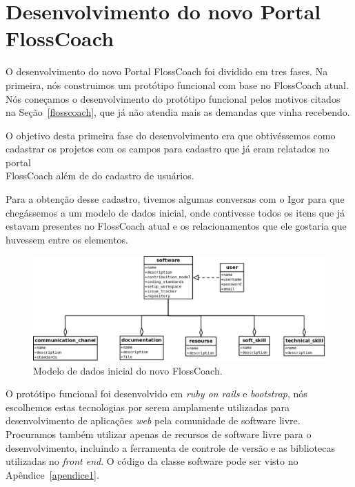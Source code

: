\chapter{Desenvolvimento do novo Portal \\FlossCoach}
\label{desenvolvimento}

O desenvolvimento do novo Portal FlossCoach foi dividido em tres fases. Na primeira, 
nós construimos um protótipo funcional com base no FlossCoach atual. Nós coneçamos o
desenvolvimento do protótipo funcional pelos motivos citados na Seção~\ref{flosscoach},
que já não atendia mais as demandas que vinha recebendo.

O objetivo desta primeira fase do desenvolvimento era que obtivéssemos como cadastrar 
os projetos com os campos para cadastro que já eram relatados no portal \\FlossCoach 
além de do cadastro de usuários.

Para a obtenção desse cadastro, tivemos algumas conversas com o Igor para que chegássemos
a um modelo de dados inicial, onde contivesse todos os itens que já estavam presentes no
FlossCoach atual e os relacionamentos que ele gostaria que huvessem entre os elementos.

\begin{figure}[h]
	\centering
	\label{fig:diagrama_iicial}
		\includegraphics[keepaspectratio=true,scale=0.35]{figuras/diagrama_inicial.eps}
	\caption{Modelo de dados inicial do novo FlossCoach.}
\end{figure}

O protótipo funcional foi desenvolvido em \textit{ruby on rails} e \textit{bootstrap},
nós escolhemos estas tecnologias por serem amplamente utilizadas para desenvolvimento
de aplicações \textit{web} pela comunidade de software livre. Procuramos também utilizar
apenas de recursos de software livre para o desenvolvimento, incluindo a ferramenta de 
controle de versão e as bibliotecas utilizadas no \textit{front end}. O código da classe
software pode ser visto no Apêndice~\ref{apendice1}.

